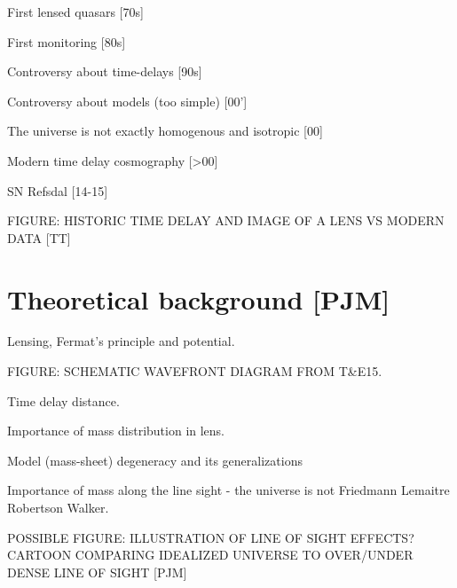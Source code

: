 First lensed quasars [70s]

First monitoring [80s]

Controversy about time-delays [90s]

Controversy about models (too simple) [00']

The universe is not exactly homogenous and isotropic [00]

Modern time delay cosmography [>00]

SN Refsdal [14-15]

FIGURE: HISTORIC TIME DELAY AND IMAGE OF A LENS VS MODERN DATA [TT]








\section{Theoretical background [PJM]}
\label{sec:theory}




Lensing, Fermat's principle and potential.

FIGURE: SCHEMATIC WAVEFRONT DIAGRAM FROM T\&E15. 

Time delay distance. 

Importance of mass distribution in lens.

Model (mass-sheet) degeneracy and its generalizations

Importance of mass along the line sight - the universe is not Friedmann Lemaitre Robertson Walker.

POSSIBLE FIGURE: ILLUSTRATION OF LINE OF SIGHT EFFECTS? CARTOON COMPARING IDEALIZED UNIVERSE TO OVER/UNDER DENSE LINE OF SIGHT [PJM]

